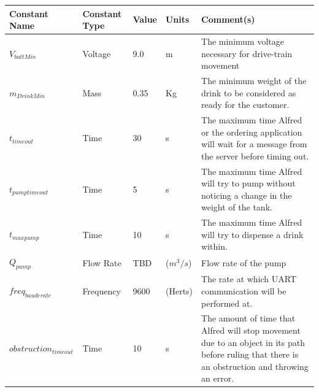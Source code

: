 \documentclass [10pt]{article}
\begin{document}
\begin{longtable}{|l|l|l|l|l|}\hline 
	\rowcolor{tableCell}Constant Name & Constant Type & Value & Units & Comment(s) \\ \hline
 	$ V_{battMin} $ & Voltage & 9.0& m &  The minimum voltage necessary for drive-train movement \\ \hline
	$ m_{DrinkMin} $ & Mass & 0.35 & Kg &  The minimum weight of the drink to be considered as ready for the customer.  \\ \hline
	$ t_{timeout} $ & Time & 30 & s & The maximum time Alfred or the ordering application will wait for a message from the server before timing out.  \\ \hline
	$ t_{pumptimeout} $ & Time & 5 & s & The maximum time Alfred will try to pump without noticing a change in the weight of the tank.  \\ \hline
	$ t_{maxpump} $ & Time & 10 & s & The maximum time Alfred will try to dispense a drink within. \\ \hline
	$Q_{pump}$ & Flow Rate & TBD & ($m^3/s$) &  Flow rate of the pump\\ \hline
	$ freq_{bauderate} $ & Frequency & 9600 & (Herts) &  The  rate at which UART communication will be performed at.\\ \hline
	$ obstruction_{timeout} $ & Time & 10 & s & The amount of time that Alfred will stop movement due to an object in its path before ruling that there is an obstruction and throwing an error. \\ \hline
\end{longtable}
\end{document}
